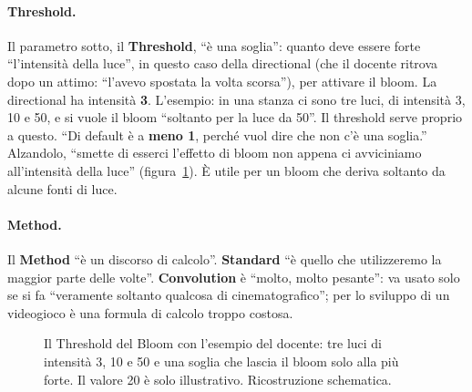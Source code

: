 \paragraph{Threshold.} Il parametro sotto, il \textbf{Threshold}, ``è una soglia'': quanto deve
essere forte ``l'intensità della luce'', in questo caso della directional (che il docente
ritrova dopo un attimo: ``l'avevo spostata la volta scorsa''), per attivare il bloom. La
directional ha intensità \textbf{3}. L'esempio: in una stanza ci sono tre luci, di intensità 3,
10 e 50, e si vuole il bloom ``soltanto per la luce da 50''. Il threshold serve proprio a
questo. ``Di default è a \textbf{meno 1}, perché vuol dire che non c'è una soglia.'' Alzandolo,
``smette di esserci l'effetto di bloom non appena ci avviciniamo all'intensità della luce''
(figura~\ref{ue16:fig:bloom}). È utile per un bloom che deriva soltanto da alcune fonti di
luce.

\paragraph{Method.} Il \textbf{Method} ``è un discorso di calcolo''. \textbf{Standard} ``è
quello che utilizzeremo la maggior parte delle volte''. \textbf{Convolution} è ``molto, molto
pesante'': va usato solo se si fa ``veramente soltanto qualcosa di cinematografico''; per lo
sviluppo di un videogioco è una formula di calcolo troppo costosa.

\begin{figure}[htbp]
\centering
{}
\caption{Il Threshold del Bloom con l'esempio del docente: tre luci di intensità 3, 10 e 50
e una soglia che lascia il bloom solo alla più forte. Il valore 20 è solo illustrativo.
Ricostruzione schematica.}
\label{ue16:fig:bloom}
\end{figure}

